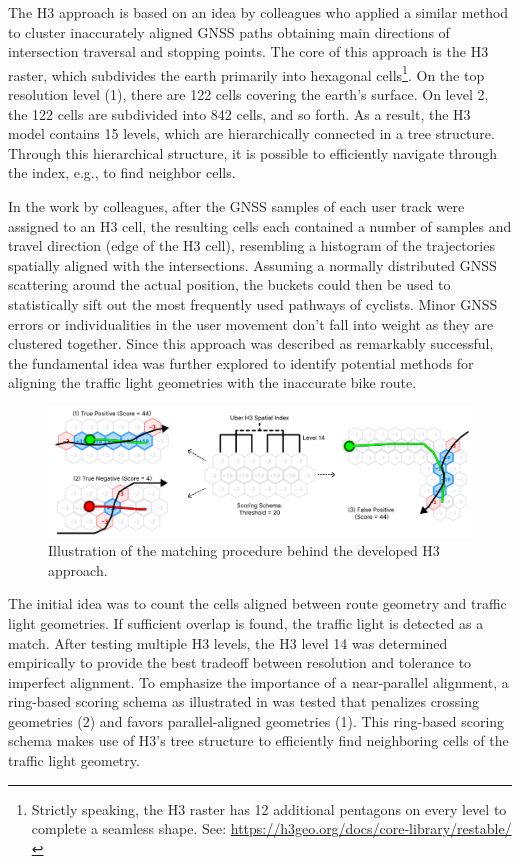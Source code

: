 The H3 approach is based on an idea by colleagues who applied a similar method to cluster inaccurately aligned GNSS paths obtaining main directions of intersection traversal and stopping points. The core of this approach is the H3 raster, which subdivides the earth primarily into hexagonal cells\footnote{Strictly speaking, the H3 raster has 12 additional pentagons on every level to complete a seamless shape. See: \url{https://h3geo.org/docs/core-library/restable/}}. On the top resolution level (1), there are 122 cells covering the earth's surface. On level 2, the 122 cells are subdivided into 842 cells, and so forth. As a result, the H3 model contains 15 levels, which are hierarchically connected in a tree structure. Through this hierarchical structure, it is possible to efficiently navigate through the index, e.g., to find neighbor cells. 

In the work by colleagues, after the GNSS samples of each user track were assigned to an H3 cell, the resulting cells each contained a number of samples and travel direction (edge of the H3 cell), resembling a histogram of the trajectories spatially aligned with the intersections. Assuming a normally distributed GNSS scattering around the actual position, the buckets could then be used to statistically sift out the most frequently used pathways of cyclists. Minor GNSS errors or individualities in the user movement don't fall into weight as they are clustered together. Since this approach was described as remarkably successful, the fundamental idea was further explored to identify potential methods for aligning the traffic light geometries with the inaccurate bike route.

\begin{figure}[htbp]
\centering
\includegraphics[width=\linewidth]{images/sg-selection-h3-approach.pdf}
\caption{Illustration of the matching procedure behind the developed H3 approach.}
\label{fig:sg-selection-h3-approach}
\end{figure}

The initial idea was to count the cells aligned between route geometry and traffic light geometries. If sufficient overlap is found, the traffic light is detected as a match. After testing multiple H3 levels, the H3 level 14 was determined empirically to provide the best tradeoff between resolution and tolerance to imperfect alignment. To emphasize the importance of a near-parallel alignment, a ring-based scoring schema as illustrated in  was tested that penalizes crossing geometries (2) and favors parallel-aligned geometries (1). This ring-based scoring schema makes use of H3's tree structure to efficiently find neighboring cells of the traffic light geometry.

